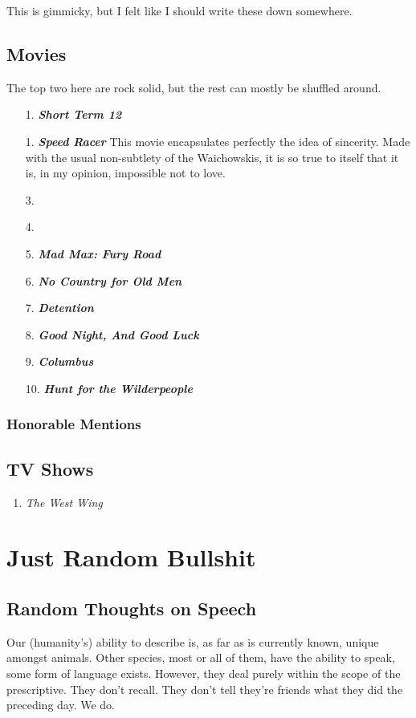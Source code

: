 \documentclass[../butidigress.tex]{subfiles}
\begin{document}
This is gimmicky, but I felt like I should write these down somewhere.
\section{Movies}\label{sec:moviestopten}
The top two here are rock solid, but the rest can mostly be shuffled around.

\begin{itemize}
    \item[1.] \textbf{\textit{Short Term 12}}
    \item[1.] \textbf{\textit{Speed Racer}} This movie encapsulates perfectly the idea of sincerity. Made with the usual non-subtlety of the Waichowskis, it is so true to itself that it is, in my opinion, impossible not to love.
    \item[3.]
    \item[4.]
    \item[5.] \textbf{\textit{Mad Max: Fury Road}}
    \item[6.] \textbf{\textit{No Country for Old Men}}
    \item[7.] \textbf{\textit{Detention}}
    \item[8.] \textbf{\textit{Good Night, And Good Luck}}
    \item[9.] \textbf{\textit{Columbus}}
    \item[10.] \textbf{\textit{Hunt for the Wilderpeople}}
\end{itemize}
\subsection{Honorable Mentions}

\section{TV Shows}
\begin{enumerate}\bfseries
    \item \textit{The West Wing}
\end{enumerate}

\chapter{Just Random Bullshit}
\newpage

\section{Random Thoughts on Speech}
Our (humanity's) ability to describe is, as far as is currently known, unique amongst animals.
Other species, most or all of them, have the ability to speak, some form of language exists.
However, they deal purely within the scope of the prescriptive.
They don't recall.
They don't tell they're friends what they did the preceding day.
We do.
\end{document}

